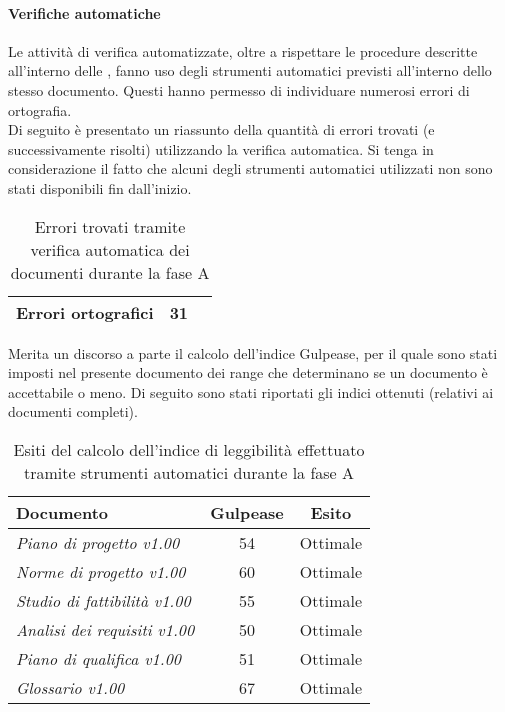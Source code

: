 \documentclass[../PianoDiQualifica.tex]{subfiles}
\begin{document}
\begin{appendices}
			\paragraph{Verifiche automatiche}
			Le attività di verifica automatizzate, oltre a rispettare le procedure descritte all'interno delle \normediprogetto, fanno uso degli strumenti automatici previsti all'interno dello stesso documento. Questi hanno permesso di individuare numerosi errori di ortografia.\\
			Di seguito è presentato un riassunto della quantità di errori trovati (e successivamente risolti) utilizzando la verifica automatica. Si tenga in considerazione il fatto che alcuni degli strumenti automatici utilizzati non sono stati disponibili fin dall'inizio.
\begin{table}[H]
		\centering
		\begin{tabular}{l * {2}{c}}
			\midrule
			Errori ortografici &	31 \\
			\midrule
		\end{tabular}
		\caption{Errori trovati tramite verifica automatica dei documenti durante la fase A}
		\label{tab:errori_automatica}
\end{table}	
			Merita un discorso a parte il calcolo dell'indice Gulpease\g, per il quale sono stati imposti nel presente documento dei range che determinano se un documento è accettabile o meno. Di seguito sono stati riportati gli indici ottenuti (relativi ai documenti completi).
\begin{table}[H]
		\centering
		\begin{tabular}{l * {2}{c}}
			\toprule
			\textbf{Documento} & \textbf{Gulpease} & \textbf{Esito} \\
			\midrule
			\textit{Piano di progetto v1.00} & 54 &  Ottimale \\
			\textit{Norme di progetto v1.00} & 60 & Ottimale \\
			\textit{Studio di fattibilità v1.00} & 55 & Ottimale \\
			\textit{Analisi dei requisiti v1.00} & 50 & Ottimale \\
			\textit{Piano di qualifica v1.00} & 51 & Ottimale \\
			\textit{Glossario v1.00} & 67 & Ottimale \\
			\bottomrule
		\end{tabular}
		\caption{Esiti del calcolo dell’indice di leggibilità effettuato tramite strumenti automatici durante la fase A}
		\label{tab:esiti_gulpease}
\end{table}

\end{appendices}
\end{document}

